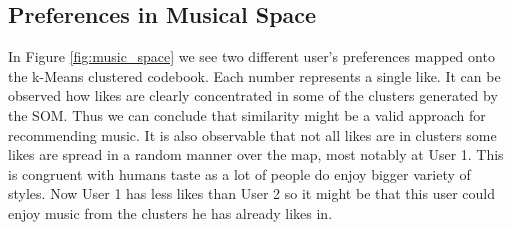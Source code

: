 \documentclass[cic,tc,english]{iiufrgs}
\begin{document}
\subsection{Preferences in Musical Space}
In Figure \ref{fig:music_space} we see two different user's preferences mapped onto the k-Means clustered codebook. Each number represents a single like. It can be observed how likes are clearly concentrated in some of the clusters generated by the SOM. Thus we can conclude that similarity might be a valid approach for recommending music. It is also observable that not all likes are in clusters some likes are spread in a random manner over the map, most notably at User 1. This is congruent with humans taste as a lot of people do enjoy bigger variety of styles. Now User 1 has less likes than User 2 so it might be that this user could enjoy music from the clusters he has already likes in. 
\end{document}
